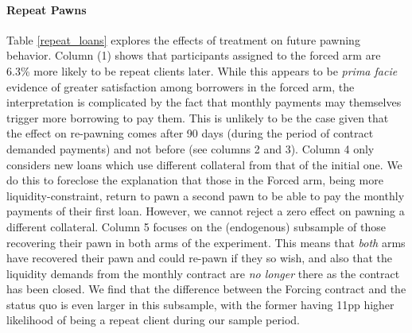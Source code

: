\documentclass[12pt, a4paper]{article}
\begin{document}
\paragraph*{Repeat Pawns}
Table \ref{repeat_loans} explores the effects of treatment on future pawning behavior.
Column (1) shows that participants assigned to the forced arm are 6.3\% more likely to be repeat clients later. %
While this appears to be \emph{prima facie} evidence of greater satisfaction among borrowers in the forced arm, the interpretation is complicated by the fact that monthly payments may themselves trigger more borrowing to pay them. This is unlikely to be the case given that the effect on re-pawning comes after 90 days (during the period of contract demanded payments) and not before  (see columns 2 and 3). Column 4 only considers new loans which use different collateral from that of the initial one. We do this to foreclose the explanation that those in the Forced arm, being more liquidity-constraint, return to pawn a second pawn to be able to pay the monthly payments of their first loan. However, we cannot reject a zero effect on pawning a different collateral. Column 5 focuses on the (endogenous) subsample of those recovering their pawn in both arms of the experiment. This means that \textit{both} arms have recovered their pawn and could re-pawn if they so wish, and also that the liquidity demands from the monthly contract are \textit{no longer} there as the contract has been closed.  We find that the difference between the Forcing contract and the status quo is even larger in this subsample, with the former having 11pp higher likelihood of being a repeat client during our sample period.
\end{document}
